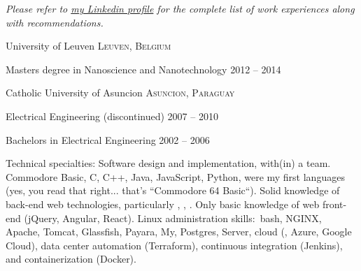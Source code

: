 \documentclass[10pt,a4paper]{article} %
\begin{document}

\begin{center}
\textit{Please refer to \href{http://www.linkedin.com/in/lugaramirez}{my Linkedin profile} for the complete list of work experiences along with recommendations.}
\end{center}


\spacedhrule{-0.2em}{-0.4em} %



\headedsection %
{University of Leuven}
{\textsc{Leuven, Belgium}} {

\headedsubsection %
{Masters degree in Nanoscience and Nanotechnology}
{2012 -- 2014}
{}
}


\headedsection %
{Catholic University of Asuncion}
{\textsc{Asuncion, Paraguay}} {

\headedsubsection %
{Electrical Engineering \textnormal{(discontinued)}}
{2007 -- 2010} {}

\headedsubsection %
{Bachelors in Electrical Engineering}
{2002 -- 2006} {}
}

\spacedhrule{0.5em}{-0.4em} %



\inlineheadsection %
{Technical specialties:}
{Software design and implementation, with(in) a team. Commodore Basic, C, C++, Java, JavaScript, Python, were my first languages (yes, you read that right... that's ``Commodore 64 Basic``). Solid knowledge of back-end web technologies, particularly , , . Only basic knowledge of web front-end (jQuery, Angular, React). Linux administration skills:\ bash, NGINX, Apache, Tomcat, Glassfish, Payara, My, Postgres, Server, cloud (, Azure, Google Cloud), data center automation (Terraform), continuous integration (Jenkins), and containerization (Docker).}
\end{document}
